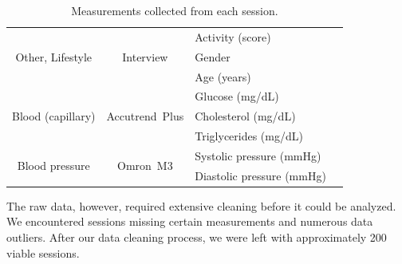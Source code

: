 \begin{table}[h]
\begin{tabular}{c c l c}
		\multirow{3}{*}{Other, Lifestyle}  & \multirow{3}{4cm}{Interview}                                                                   & Activity   (score)                        \\
		                                   &                                                                                                & Gender                                    \\
		                                   &                                                                                                & Age (years)                               \\

		\midrule

		\multirow{3}{*}{Blood (capillary)} & \multirow{3}{4cm}{Accutrend\textregistered\ Plus}                                              & Glucose (mg/dL)                           \\
		                                   &                                                                                                & Cholesterol (mg/dL)                       \\
		                                   &                                                                                                & Triglycerides (mg/dL)                     \\

		\midrule

		\multirow{2}{*}{Blood pressure}    & \multirow{2}{4cm}{Omron\textregistered\ M3}                                                    & Systolic pressure (mmHg)                  \\
		                                   &

		                                   & Diastolic pressure (mmHg)                                                                                                                  \\
		\bottomrule

	\end{tabular}
	\caption{Measurements collected from each session.}
\end{table}

The raw data, however, required extensive cleaning before it could be analyzed. We encountered sessions missing certain measurements and numerous data outliers. After our data cleaning process, we were left with approximately 200 viable sessions.

